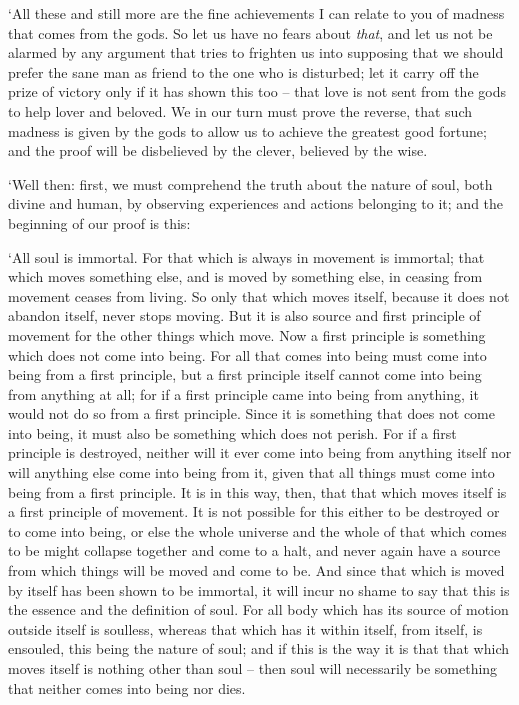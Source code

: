 ‘All these and still more are the fine achievements I can relate
 to you of madness that comes from the gods. So let us have no
fears about {\em that}, and let us not be alarmed by any argument that
tries to frighten us into supposing that we should prefer the sane man
as friend to the one who is disturbed; let it carry  off the
prize of victory only if it has shown this too -- that love is not sent
from the gods to help lover and beloved. We in our turn must prove the
reverse, that such madness is given by the  gods to allow us to
achieve the greatest good fortune; and the proof will be disbelieved by
the clever, believed by the wise.

‘Well then: first, we must comprehend the truth about the nature of
soul, both divine and human, by observing experiences and actions
belonging to it; and the beginning of our  proof is this:

‘All soul is immortal. For that which is always in movement is immortal;
that which moves something else, and is moved by something else, in
ceasing from movement ceases from living. So only that which moves
itself, because it does not abandon itself, never stops moving. But it
is also source and first principle  of movement for the other
things which move. Now a first  principle is something which
does not come into being. For all that comes into being must come into
being from a first principle, but a first principle itself cannot come
into being from anything at all; for if a first principle came into
being from anything, it would not do so from a first
principle. Since it is
something that does not come into being, it must also be something which
does not perish. For if a first principle is destroyed, neither will it
 ever come into being from anything itself nor will anything
else come into being from it, given that all things must come into being
from a first principle. It is in this way, then, that that which moves
 itself is a first principle of movement. It is not possible
for this either to be destroyed or to come into being, or else the whole
universe and the whole of that which comes  to be might collapse
together and come to a halt, and never again have a source from which
things will be moved and come to be. And since that which is moved by
itself has been shown to be immortal, it will incur no shame to say that
this is the  essence and the definition of soul. For all body
which has its source of motion outside itself is soulless, whereas that
which has it within itself, from itself, is ensouled, this being the
nature of soul; and if this is the way it is that that which moves
itself is nothing other than soul -- then soul will necessarily be
something that neither comes into being nor dies.

